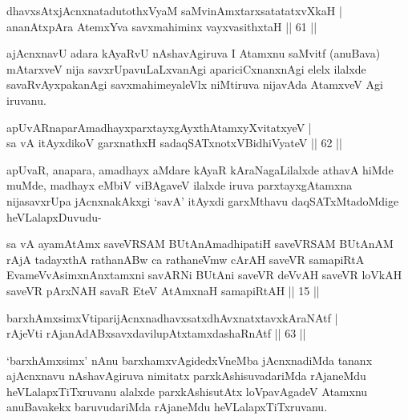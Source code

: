 \begin{shl}
dhavxsAtxjAcnxnatadutothxVyaM saMvinAmxtarxsatatatxvXkaH |\\
ananAtxpAra AtemxYva savxmahiminx vayxvasithxtaH \hfill || 61 ||
\end{shl}

\begin{artha}
ajAcnxnavU adara kAyaRvU nAshavAgiruva I Atamxnu saMvitf (anuBava) mAtarxveV nija savxrUpavuLaLxvanAgi apariciCxnanxnAgi elelx ilalxde savaRvAyxpakanAgi savxmahimeyaleVlx niMtiruva nijavAda AtamxveV Agi iruvanu.
\end{artha}


\begin{shl}
apUvARnaparAmadhayxparxtayxgAyxthAtamxyXvitatxyeV |\\
sa vA itAyxdikoV garxnathxH sadaqSATxnotxV\s BidhiVyateV \hfill || 62 ||
\end{shl}

\begin{artha}
apUvaR, anapara, amadhayx aMdare kAyaR kAraNagaLilalxde athavA hiMde
muMde, madhayx eMbiV viBAgaveV ilalxde iruva parxtayxgAtamxna
nijasavxrUpa jAcnxnakAkxgi `savA' itAyxdi garxMthavu daqSATxMtadoMdige
heVLalapxDuvudu-
\end{artha}


\begin{kandikeshl}
sa vA ayamAtAmx saveVRSAM BUtAnAmadhipatiH saveVRSAM BUtAnAM rAjA tadayxthA rathanABw ca rathaneVmw cArAH saveVR samapiRtA EvameVvAsimxnAnxtamxni savARNi BUtAni saveVR deVvAH saveVR loVkAH saveVR pArxNAH savaR EteV AtAmxnaH samapiRtAH || 15 ||
\end{kandikeshl}



\begin{shl}
barxhAmxsimxVtiparijAcnxnadhavxsatxdhAvxnatxtavxkAraNAtf |\\
rAjeVti rAjanAdABxsavxdavilupAtxtamxdashaRnAtf \hfill || 63 ||
\end{shl}
\begin{artha}
`barxhAmxsimx' nAnu barxhamxvAgidedxVneMba jAcnxnadiMda tananx   ajAcnxnavu nAshavAgiruva nimitatx parxkAshisuvadariMda rAjaneMdu   heVLalapxTiTxruvanu alalxde parxkAshisutAtx loVpavAgadeV Atamxnu   anuBavakekx baruvudariMda rAjaneMdu heVLalapxTiTxruvanu.
\end{artha}

